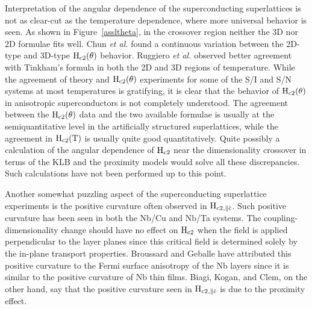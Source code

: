         Interpretation of   the angular  dependence of the  superconducting
superlattices is not as clear-cut as the temperature dependence, where more
universal  behavior is seen.   As  shown in Figure~\ref{assltheta}, in  the
crossover region  neither the 3D nor  2D formulae fits well.   Chun {\em et
al.} found  a continuous variation   between the   2D-type and 3D-type $\rm
H_{c2}(\theta)$   behavior.    Ruggiero  {\em  et   al.\/} observed  better
agreement with Tinkham's   formula in  both  the 2D    and  3D regions   of
temperature.\cite{ruggiero82} While  the agreement of theory  and   $\rm
H_{c2}(\theta)$ experiments for some  of the S/I  and S/N systems  at  most
temperatures  is   gratifying, it   is  clear that   the behavior  of  $\rm
H_{c2}(\theta)$   in  anisotropic   superconductors   is   not   completely
understood.\cite{broussard87,ruggiero82}  The  agreement  between the  $\rm
H_{c2}(\theta)$  data and  the two available  formulae  is usually   at the
semiquantitative level in the artificially  structured superlattices, while
the  agreement     in    $\rm  H_{c2}(T)$    is    usually   quite     good
quantitatively.\cite{ruggiero82}   Quite  possibly   a calculation of   the
angular dependence  of $\rm H_{c2}$ near  the  dimensionality crossover  in
terms  of the  KLB   and  the proximity  models   would  solve    all these
discrepancies. Such calculations have not been performed up to this point.

        Another    somewhat puzzling    aspect      of the  superconducting
superlattice experiments is  the positive curvature  often observed in $\rm
H_{c2, \parallel \hat{c}}$.  Such positive curvature has  been seen in both
the     Nb/Cu       and   Nb/Ta    systems.\cite{chun84,broussard87}    The
coupling-dimensionality change should  have no effect on $\rm  H_{c2}$ when
the field is applied perpendicular to the layer  planes since this critical
field is determined solely by the in-plane transport properties.  Broussard
and  Geballe\cite{broussard87} have attributed   this positive curvature to
the Fermi  surface anisotropy of the Nb  layers since it  is similar to the
positive curvature of Nb thin films.  Biagi, Kogan, and Clem, on the other
hand, say that the positive curvature seen in $\rm H_{c2, \parallel
\hat{c}}$  is due to the proximity effect.\cite{biagi85}

